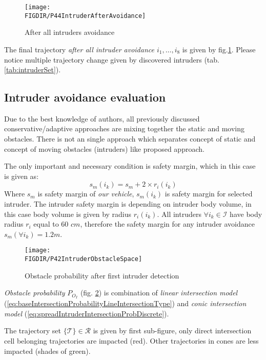 \begin{figure}[H]
    \centering
    \texttt{[image: \\FIGDIR/P44IntruderAfterAvoidance]}
    \caption{After all intruders avoidance}
    \label{fig:P44IntruderAfterAvoidance}
\end{figure}
\noindent The final trajectory \emph{after all intruder avoidance $i_1,\dots,i_8$} is given by fig.\ref{fig:P44IntruderAfterAvoidance}. Please notice multiple trajectory change given by discovered intruders (tab. \ref{tab:intruderSet}).

\subsection{Intruder avoidance evaluation}
\noindent Due to the best knowledge of authors, all previously discussed conservative/adaptive approaches are mixing together the static and moving obstacles. There is not an single approach which separates concept of static and concept of moving obstacles (intruders) like proposed approach. 

The only important and necessary condition is safety margin, which in this case is given as: 
\begin{equation}
    s_m(i_k) = s_m + 2\times r_i(i_k)
\end{equation}
\noindent Where $s_m$ is safety margin of \emph{our vehicle}, $s_m(i_k)$ is safety margin for selected intruder. The intruder safety margin is depending on intruder body volume, in this case body volume is given by radius $r_i(i_k)$. All intruders $\forall i_k\in\mathscr{I}$ have body radius  $r_i$ equal to $60$ $cm$, therefore the safety margin for any intruder avoidance $s_m(\forall i_k)=1.2 m$.

\begin{figure}[H]
    \centering
    \texttt{[image: \\FIGDIR/P42IntruderObstacleSpace]}
    \caption{Obstacle probability after first intruder detection}
    \label{fig:P42IntruderObstacleSpace}
\end{figure}
\noindent\emph{Obstacle probability} $P_{O_I}$ (fig. \ref{fig:P42IntruderObstacleSpace}) is combination of \emph{linear intersection model} (\ref{eq:baseIntersectionProbabilityLineIntersectionType}) and \emph{conic intersection model} (\ref{eq:spreadIntruderIntersectionProbDiscrete}).

The trajectory set $\{\mathscr{T}\}\in\mathscr{R}$ is given by first sub-figure, only direct intersection cell belonging trajectories are impacted (red). Other trajectories in cones are less impacted (shades of green). 

